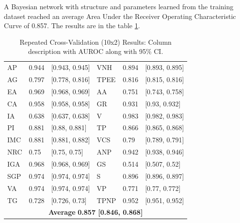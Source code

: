 A Bayesian network with structure and parameters learned from the training dataset reached an average Area Under the Receiver Operating Characteristic Curve of 0.857. The results are in the table \ref{tab:result_auc}.



\begin{table}[htpb]
 \caption{Repeated Cross-Validation (10x2) Results: Column description with AUROC along with 95\% CI.} \label{tab:result_auc} 

\renewcommand{\arraystretch}{1.2}
\centering
\begin{tabular} { p{1.5cm} p{1.5cm} p{3cm} p{1.5cm} p{1.5cm} l }
\hline
AP & 0.944 & [0.943, 0.945] & VNH & 0.894 & [0.893, 0.895] \\
AG & 0.797 & [0.778, 0.816] & TPEE & 0.816 & [0.815, 0.816] \\
EA & 0.969 & [0.968, 0.969] & AA & 0.751 & [0.743, 0.758] \\
CA & 0.958 & [0.958, 0.958] & GR & 0.931 & [0.93, 0.932] \\
IA & 0.638 & [0.637, 0.638] & V & 0.983 & [0.982, 0.983] \\
PI & 0.881 & [0.88, 0.881] & TP & 0.866 & [0.865, 0.868] \\
IMC & 0.881 & [0.881, 0.882] & VCS & 0.79 & [0.789, 0.791] \\
NRC & 0.75 & [0.75, 0.75] & ANP & 0.942 & [0.938, 0.946] \\
IGA & 0.968 & [0.968, 0.969] & GS & 0.514 & [0.507, 0.52] \\
SGP & 0.974 & [0.974, 0.974] & S & 0.896 & [0.896, 0.897] \\
VA & 0.974 & [0.974, 0.974] & VP & 0.771 & [0.77, 0.772] \\
TG & 0.728 & [0.726, 0.73] & TPNP & 0.952 & [0.951, 0.952] \\
\hline
 \multicolumn{6}{c}{\textbf{Average}  \textbf{0.857 [0.846, 0.868]}} \\

\hline
\end{tabular}
\end{table}


